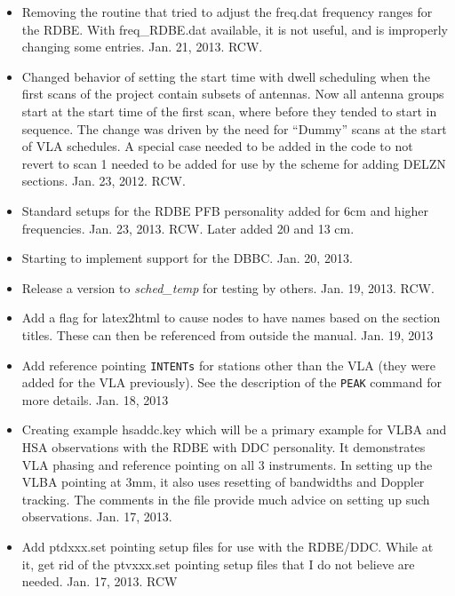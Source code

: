 \documentclass{report}
\begin{document}
\begin{itemize}
\item Removing the routine that tried to adjust the freq.dat frequency
ranges for the RDBE.  With freq\_RDBE.dat available, it is not useful,
and is improperly changing some entries.  Jan. 21, 2013.  RCW.

\item Changed behavior of setting the start time with dwell scheduling
when the first scans of the project contain subsets of antennas.  Now
all antenna groups start at the start time of the first scan, where
before they tended to start in sequence.  The change was driven by the
need for ``Dummy'' scans at the start of VLA schedules.  A special
case needed to be added in the code to not revert to scan 1 needed to
be added for use by the scheme for adding DELZN sections.  Jan. 23,
2012. RCW.

\item Standard setups for the RDBE PFB personality added for 6cm and 
higher frequencies.  Jan. 23, 2013. RCW.  Later added 20 and 13 cm.

\item Starting to implement support for the DBBC.  Jan. 20, 2013.

\item Release a version to {\sl sched\_temp} for testing by others.  
Jan. 19, 2013. RCW.

\item Add a flag for latex2html to cause nodes to have names based on the
section titles.  These can then be referenced from outside the manual.
Jan. 19, 2013

\item Add reference pointing {\tt INTENTs} for stations other than the
VLA (they were added for the VLA previously).  See the description
of the {\tt PEAK} command for more details.    Jan. 18, 2013

\item Creating example hsaddc.key which will be a primary example for
VLBA and HSA observations with the RDBE with DDC personality.  It 
demonstrates VLA phasing and reference pointing on all 3 instruments.
In setting up the VLBA pointing at 3mm, it also uses resetting of
bandwidths and Doppler tracking.  The comments in the file provide
much advice on setting up such observations.  Jan. 17, 2013.

\item Add ptdxxx.set pointing setup files for use with the RDBE/DDC.
While at it, get rid of the ptvxxx.set pointing setup files that I do not
believe are needed.  Jan. 17, 2013.  RCW


\end{itemize}
\end{document}
